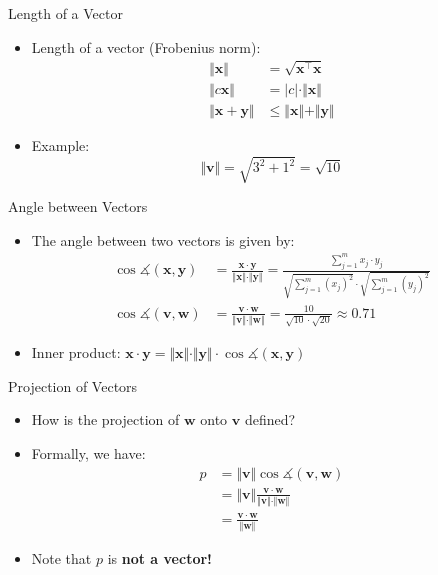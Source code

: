 \begin{frame}{Length of a Vector}{}
	\begin{itemize}
		\item Length of a vector (Frobenius norm):
		\begin{align}
			\Vert \bm{x} \Vert
				&= \sqrt{\bm{x}^{\intercal} \bm{x}}		\\[1mm]
			\Vert c \bm{x} \Vert
				&= \vert c \vert \cdot \Vert \bm{x} \Vert	\\[1mm]
			\Vert \bm{x} + \bm{y} \Vert
				&\le \Vert \bm{x} \Vert + \Vert \bm{y} \Vert
		\end{align}
		\item Example:
		\begin{equation*}
			\Vert \bm{v} \Vert = \sqrt{3^2 + 1^2} = \sqrt{10}
		\end{equation*}
	\end{itemize}
\end{frame}


\begin{frame}{Angle between Vectors}{}
	\begin{itemize}
		\item The angle between two vectors is given by:
		\begin{align}
			\cos \measuredangle (\bm{x}, \bm{y}) &= \frac{\bm{x} \cdot \bm{y}}{\Vert \bm{x} \Vert \cdot \Vert \bm{y} \Vert}
				= \frac{\sum_{j=1}^m x_j \cdot y_j}{\sqrt{\sum_{j=1}^m (x_j)^2} \cdot \sqrt{\sum_{j=1}^m (y_j)^2}} \\[3mm]
			\nonumber
			\cos \measuredangle (\bm{v}, \bm{w}) &= \frac{\bm{v} \cdot \bm{w}}{\Vert \bm{v} \Vert \cdot \Vert \bm{w} \Vert}
				= \frac{10}{\sqrt{10} \cdot \sqrt{20}} \approx 0.71
		\end{align}
		\vspace*{1mm}
		\item Inner product: $\bm{x} \cdot \bm{y}
			= \Vert \bm{x} \Vert \cdot \Vert \bm{y} \Vert \cdot \cos \measuredangle (\bm{x}, \bm{y})$
	\end{itemize}
\end{frame}


\begin{frame}{Projection of Vectors}{}
	\begin{itemize}
		\item How is the projection of $\bm{w}$ onto $\bm{v}$ defined?
		\item Formally, we have:
		\begin{align}
			\nonumber
			p 	&= \Vert \bm{v} \Vert \cos \measuredangle (\bm{v}, \bm{w}) 							\\[1mm]
			\nonumber
				&= \Vert \bm{v} \Vert \frac{\bm{v} \cdot \bm{w}}{\Vert \bm{v} \Vert \cdot \Vert \bm{w} \Vert} 	\\[1mm]
				&= \frac{\bm{v} \cdot \bm{w}}{\Vert \bm{w} \Vert}
		\end{align}
		\item Note that $p$ is \textbf{not a vector!}
	\end{itemize}
\end{frame}


